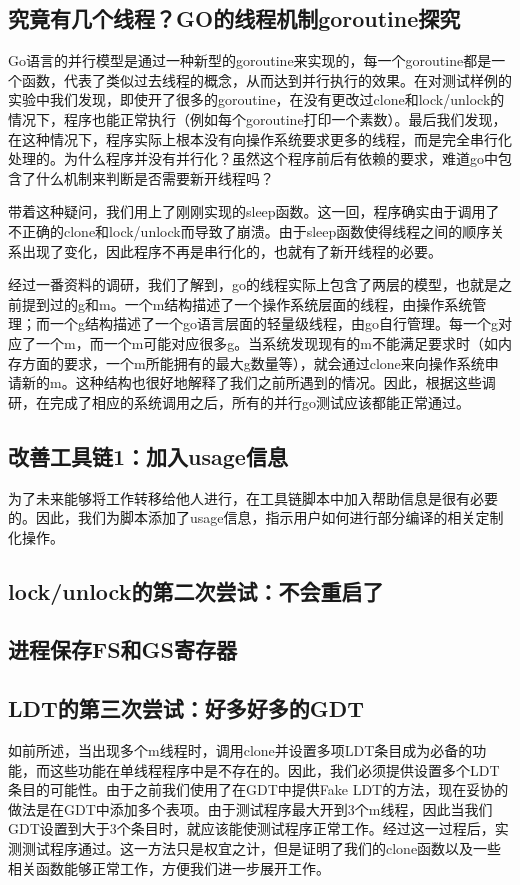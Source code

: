 \documentclass{article}
\begin{document}
\subsection{究竟有几个线程？GO的线程机制goroutine探究}
Go语言的并行模型是通过一种新型的goroutine来实现的，每一个goroutine都是一个函数，代表了类似过去线程的概念，从而达到并行执行的效果。在对测试样例的实验中我们发现，即使开了很多的goroutine，在没有更改过clone和lock/unlock的情况下，程序也能正常执行（例如每个goroutine打印一个素数）。最后我们发现，在这种情况下，程序实际上根本没有向操作系统要求更多的线程，而是完全串行化处理的。为什么程序并没有并行化？虽然这个程序前后有依赖的要求，难道go中包含了什么机制来判断是否需要新开线程吗？

带着这种疑问，我们用上了刚刚实现的sleep函数。这一回，程序确实由于调用了不正确的clone和lock/unlock而导致了崩溃。由于sleep函数使得线程之间的顺序关系出现了变化，因此程序不再是串行化的，也就有了新开线程的必要。

经过一番资料的调研，我们了解到，go的线程实际上包含了两层的模型，也就是之前提到过的g和m。一个m结构描述了一个操作系统层面的线程，由操作系统管理；而一个g结构描述了一个go语言层面的轻量级线程，由go自行管理。每一个g对应了一个m，而一个m可能对应很多g。当系统发现现有的m不能满足要求时（如内存方面的要求，一个m所能拥有的最大g数量等），就会通过clone来向操作系统申请新的m。这种结构也很好地解释了我们之前所遇到的情况。因此，根据这些调研，在完成了相应的系统调用之后，所有的并行go测试应该都能正常通过。

\subsection{改善工具链1：加入usage信息}
为了未来能够将工作转移给他人进行，在工具链脚本中加入帮助信息是很有必要的。因此，我们为脚本添加了usage信息，指示用户如何进行部分编译的相关定制化操作。

\subsection{lock/unlock的第二次尝试：不会重启了}

\subsection{进程保存FS和GS寄存器}

\subsection{LDT的第三次尝试：好多好多的GDT}
如前所述，当出现多个m线程时，调用clone并设置多项LDT条目成为必备的功能，而这些功能在单线程程序中是不存在的。因此，我们必须提供设置多个LDT条目的可能性。由于之前我们使用了在GDT中提供Fake LDT的方法，现在妥协的做法是在GDT中添加多个表项。由于测试程序最大开到3个m线程，因此当我们GDT设置到大于3个条目时，就应该能使测试程序正常工作。经过这一过程后，实测测试程序通过。这一方法只是权宜之计，但是证明了我们的clone函数以及一些相关函数能够正常工作，方便我们进一步展开工作。
\end{document}
